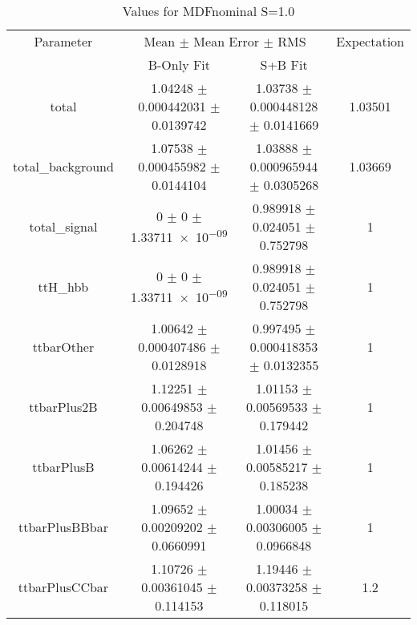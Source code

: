 \begin{table}
\centering
\caption{Values for MDFnominal S=1.0}
\begin{tabular}{cccc}
\toprule
Parameter & \multicolumn{2}{c}{Mean $\pm$ Mean Error $\pm$ RMS} & Expectation\\
 & B-Only Fit & S+B Fit & \\
\midrule
total & \num{1.04248} $\pm$ \num{0.000442031} $\pm$ \num{0.0139742} & \num{1.03738} $\pm$ \num{0.000448128} $\pm$ \num{0.0141669} & \num{1.03501}\\
total\_background & \num{1.07538} $\pm$ \num{0.000455982} $\pm$ \num{0.0144104} & \num{1.03888} $\pm$ \num{0.000965944} $\pm$ \num{0.0305268} & \num{1.03669}\\
total\_signal & \num{0} $\pm$ \num{0} $\pm$ \num{1.33711e-09} & \num{0.989918} $\pm$ \num{0.024051} $\pm$ \num{0.752798} & \num{1}\\
ttH\_hbb & \num{0} $\pm$ \num{0} $\pm$ \num{1.33711e-09} & \num{0.989918} $\pm$ \num{0.024051} $\pm$ \num{0.752798} & \num{1}\\
ttbarOther & \num{1.00642} $\pm$ \num{0.000407486} $\pm$ \num{0.0128918} & \num{0.997495} $\pm$ \num{0.000418353} $\pm$ \num{0.0132355} & \num{1}\\
ttbarPlus2B & \num{1.12251} $\pm$ \num{0.00649853} $\pm$ \num{0.204748} & \num{1.01153} $\pm$ \num{0.00569533} $\pm$ \num{0.179442} & \num{1}\\
ttbarPlusB & \num{1.06262} $\pm$ \num{0.00614244} $\pm$ \num{0.194426} & \num{1.01456} $\pm$ \num{0.00585217} $\pm$ \num{0.185238} & \num{1}\\
ttbarPlusBBbar & \num{1.09652} $\pm$ \num{0.00209202} $\pm$ \num{0.0660991} & \num{1.00034} $\pm$ \num{0.00306005} $\pm$ \num{0.0966848} & \num{1}\\
ttbarPlusCCbar & \num{1.10726} $\pm$ \num{0.00361045} $\pm$ \num{0.114153} & \num{1.19446} $\pm$ \num{0.00373258} $\pm$ \num{0.118015} & \num{1.2}\\
\bottomrule
\end{tabular}
\end{table}